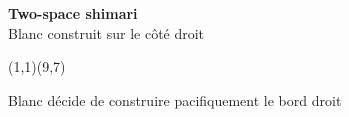 \documentclass[preview, border=0pt, varwidth=false]{standalone}
\begin{document}
	\setgounit{0.6cm} 
	
	\parbox[c][14.65cm][c]{10.2cm}{
		\centering
		
		{\Large\textbf{Two-space shimari} \\ Blanc construit sur le côté droit}
		\vspace{3em}
		
		\begin{psgopartialboard}{(1,1)(9,7)}
			\pass
		\end{psgopartialboard}
		
		\vspace{1em}
		Blanc décide de construire pacifiquement le bord droit
	}
	
\end{document}
